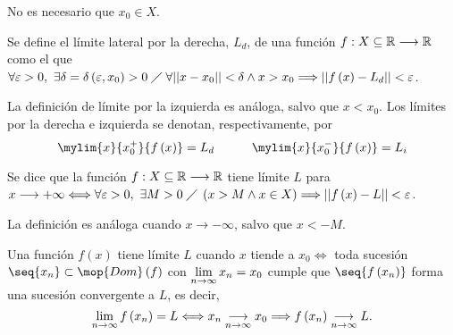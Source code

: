 \begin{remark}
    No es necesario que $x_0\in X$.
\end{remark}

\begin{defi}
    Se define el límite lateral por la derecha, $L_d$, de una función $f : X\subseteq\mathbb{R}\longrightarrow \mathbb{R}$ como el
    que $\forall\varepsilon > 0,\ \exists\delta = \delta\left( \varepsilon, x_0 \right) > 0\;\diagup\; \forall||x - 
    x_0|| < \delta\land x > x_0\Longrightarrow||f\left( x \right) - L_d|| < \varepsilon$.

    La definición de límite por la izquierda es análoga, salvo que $x < x_0$. Los límites por la derecha
    e izquierda se denotan, respectivamente, por
    \begin{equation}
        \mylim{x}{x_0^+}{f\left( x \right) } = L_d\quad\quad\quad \mylim{x}{x_0^-}{f\left( x \right) } = L_i
    \end{equation}
\end{defi}

\begin{defi}
    Se dice que la función $f : X\subseteq\mathbb{R}\longrightarrow \mathbb{R}$ tiene límite $L$ para $x\longrightarrow +\infty \Longleftrightarrow
        \forall\varepsilon > 0,\ \exists M > 0\;\diagup\; \left( x > M\land x\in X \right) \Longrightarrow ||f\left( x \right) - L|| < \varepsilon$.

        La definición es análoga cuando $x\longrightarrow -\infty$, salvo que $x < -M$.
\end{defi}

\begin{theorem}
    Una función $f\left( x \right) $ tiene límite $L$ cuando $x$ tiende a $x_0\iff$ toda sucesión $\seq{x_n}\subset\mop{Dom}\left( f \right)$
        con $\liminft{n}x_n = x_{0}$ cumple que $\seq{f\left( x_n \right) }$ forma una sucesión convergente
        a $L$, es decir,
        \begin{equation}
            \liminft{n}f\left( x_n \right) = L \iff x_n\underset{n\to\infty}{\longrightarrow} x_0 \implies f\left( x_n \right) \underset{n\to\infty}{\longrightarrow} L.
        \end{equation}
\end{theorem}

